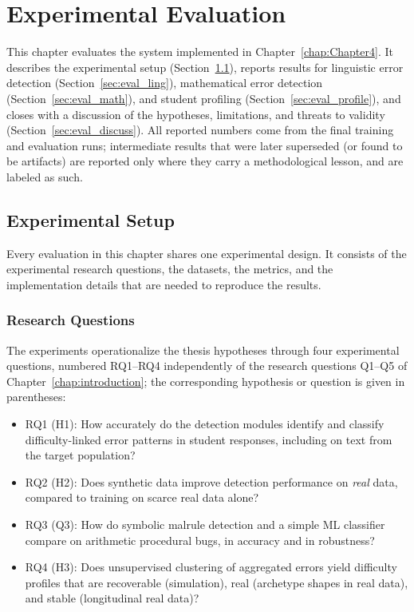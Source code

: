 
\chapter{Experimental Evaluation} %
\label{chap:Chapter5} %


This chapter evaluates the system implemented in Chapter~\ref{chap:Chapter4}. It describes the experimental setup (Section~\ref{sec:eval_setup}), reports results for linguistic error detection (Section~\ref{sec:eval_ling}), mathematical error detection (Section~\ref{sec:eval_math}), and student profiling (Section~\ref{sec:eval_profile}), and closes with a discussion of the hypotheses, limitations, and threats to validity (Section~\ref{sec:eval_discuss}). All reported numbers come from the final training and evaluation runs; intermediate results that were later superseded (or found to be artifacts) are reported only where they carry a methodological lesson, and are labeled as such.

\section{Experimental Setup}
\label{sec:eval_setup}

Every evaluation in this chapter shares one experimental design. It consists of the experimental research questions, the datasets, the metrics, and the implementation details that are needed to reproduce the results.

\subsection{Research Questions}
\label{sec:eval_setup_rq}

The experiments operationalize the thesis hypotheses through four experimental questions, numbered RQ1--RQ4 independently of the research questions Q1--Q5 of Chapter~\ref{chap:introduction}; the corresponding hypothesis or question is given in parentheses:

\begin{itemize}
    \item RQ1 (H1): How accurately do the detection modules identify and classify difficulty-linked error patterns in student responses, including on text from the target population?
    \item RQ2 (H2): Does synthetic data improve detection performance on \emph{real} data, compared to training on scarce real data alone?
    \item RQ3 (Q3): How do symbolic malrule detection and a simple ML classifier compare on arithmetic procedural bugs, in accuracy and in robustness?
    \item RQ4 (H3): Does unsupervised clustering of aggregated errors yield difficulty profiles that are recoverable (simulation), real (archetype shapes in real data), and stable (longitudinal real data)?
\end{itemize}

